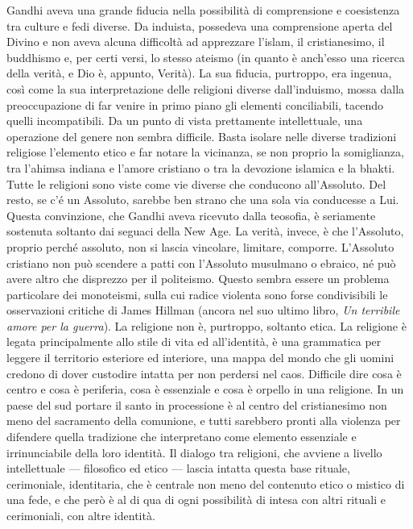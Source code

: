 \documentclass[12pt,oneside,openany]{book}
\begin{document}
Gandhi aveva una grande fiducia nella possibilità di comprensione e coesistenza tra culture e fedi diverse. Da induista, possedeva una comprensione aperta del Divino e non aveva alcuna difficoltà ad apprezzare l'islam, il cristianesimo, il buddhismo e, per certi versi, lo stesso ateismo (in quanto è anch'esso una ricerca della verità, e Dio è, appunto, Verità). La sua fiducia, purtroppo, era ingenua, così come la sua interpretazione delle religioni diverse dall'induismo, mossa dalla preoccupazione di far venire in primo piano gli elementi conciliabili, tacendo quelli incompatibili. Da un punto di vista prettamente intellettuale, una operazione del genere non sembra difficile. Basta isolare nelle diverse tradizioni religiose l'elemento etico e far notare la vicinanza, se non proprio la somiglianza, tra l'ahimsa indiana e l'amore cristiano o tra la devozione islamica e la bhakti. Tutte le religioni sono viste come vie diverse che conducono all'Assoluto. Del resto, se c'é un Assoluto, sarebbe ben strano che una sola via conducesse a Lui. Questa convinzione, che Gandhi aveva ricevuto dalla teosofia, è seriamente sostenuta soltanto dai seguaci della New Age. La verità, invece, è che l'Assoluto, proprio perché assoluto, non si lascia vincolare, limitare, comporre. L'Assoluto cristiano non può scendere a patti con l'Assoluto musulmano o ebraico, né può avere altro che disprezzo per il politeismo. Questo sembra essere un problema particolare dei monoteismi, sulla cui radice violenta sono forse condivisibili le osservazioni critiche di James Hillman (ancora nel suo ultimo libro, \emph{Un terribile amore per la guerra}). La religione non è, purtroppo, soltanto etica. La religione è legata principalmente allo stile di vita ed all'identità, è una grammatica per leggere il territorio esteriore ed interiore, una mappa del mondo che gli uomini credono di dover custodire intatta per non perdersi nel caos. Difficile dire cosa è centro e cosa è periferia, cosa è essenziale e cosa è orpello in una religione. In un paese del sud portare il santo in processione è al centro del cristianesimo non meno del sacramento della comunione, e tutti sarebbero pronti alla violenza per difendere quella tradizione che interpretano come elemento essenziale e irrinunciabile della loro identità. Il dialogo tra religioni, che avviene a livello intellettuale --- filosofico ed etico --- lascia intatta questa base rituale, cerimoniale, identitaria, che è centrale non meno del contenuto etico o mistico di una fede, e che però è al di qua di ogni possibilità di intesa con altri rituali e cerimoniali, con altre identità.
\end{document}
